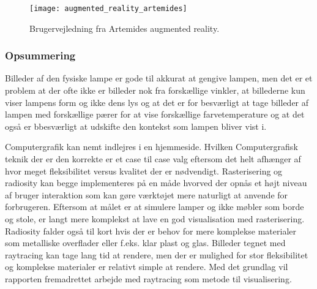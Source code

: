 \begin{figure}[H]
    \centering
    \texttt{[image: augmented\_reality\_artemides]}
    \caption{Brugervejledning fra Artemides augmented reality.}
    \label{fig:augmented_reality_artemides}
\end{figure} 


\subsubsection*{Opsummering}
Billeder af den fysiske lampe er gode til akkurat at gengive lampen, men det er et problem at der ofte ikke er billeder nok fra forskællige vinkler, at billederne kun viser lampens form og ikke dens lys og at det er for besværligt at tage billeder af lampen med forskællige pærer for at vise forskællige farvetemperature og at det også er bbesværligt at udskifte den kontekst som lampen bliver vist i. 

Computergrafik kan nemt indlejres i en hjemmeside. Hvilken Computergrafisk teknik der er den korrekte er et case til case valg eftersom det helt afhænger af hvor meget fleksibilitet versus kvalitet der er nødvendigt. Rasterisering og radiosity kan begge implementeres på en måde hvorved der opnås et højt niveau af bruger interaktion som kan gøre værktøjet mere naturligt at anvende for forbrugeren. Eftersom at målet er at simulere lamper og ikke møbler som borde og stole, er langt mere komplekst at lave en god visualisation med rasterisering. Radiosity falder også til kort hvis der er behov for mere komplekse materialer som metalliske overflader eller f.eks. klar plast og glas. Billeder tegnet med raytracing kan tage lang tid at rendere, men der er mulighed for stor fleksibilitet og komplekse materialer er relativt simple at rendere. Med det grundlag vil rapporten fremadrettet arbejde med raytracing som metode til visualisering.
